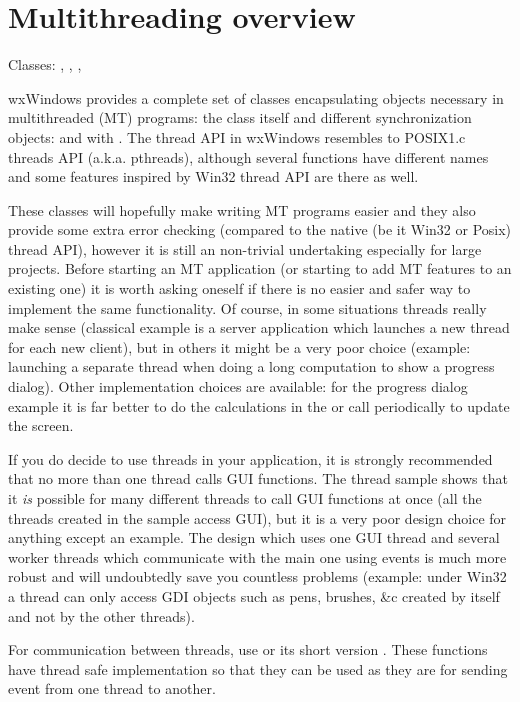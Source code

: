\section{Multithreading overview}\label{wxthreadoverview}

Classes: , , 
, 

wxWindows provides a complete set of classes encapsulating objects necessary in
multithreaded (MT) programs: the  class itself and different
synchronization objects:  and 
 with 
. The thread API in wxWindows resembles to
POSIX1.c threads API (a.k.a. pthreads), although several functions have
different names and some features inspired by Win32 thread API are there as
well.

These classes will hopefully make writing MT programs easier and they also
provide some extra error checking (compared to the native (be it Win32 or Posix)
thread API), however it is still an non-trivial undertaking especially for large
projects. Before starting an MT application (or starting to add MT features to
an existing one) it is worth asking oneself if there is no easier and safer way
to implement the same functionality. Of course, in some situations threads
really make sense (classical example is a server application which launches a
new thread for each new client), but in others it might be a very poor choice
(example: launching a separate thread when doing a long computation to show a
progress dialog). Other implementation choices are available: for the progress
dialog example it is far better to do the calculations in the 
 or call  
periodically to update the screen.

If you do decide to use threads in your application, it is strongly recommended
that no more than one thread calls GUI functions. The thread sample shows that
it {\it is} possible for many different threads to call GUI functions at once
(all the threads created in the sample access GUI), but it is a very poor design
choice for anything except an example. The design which uses one GUI thread and
several worker threads which communicate with the main one using events is much
more robust and will undoubtedly save you countless problems (example: under
Win32 a thread can only access GDI objects such as pens, brushes, \&c created by
itself and not by the other threads).

For communication between threads, use 
or its short version . These functions
have thread safe implementation so that they can be used as they are for
sending event from one thread to another.


